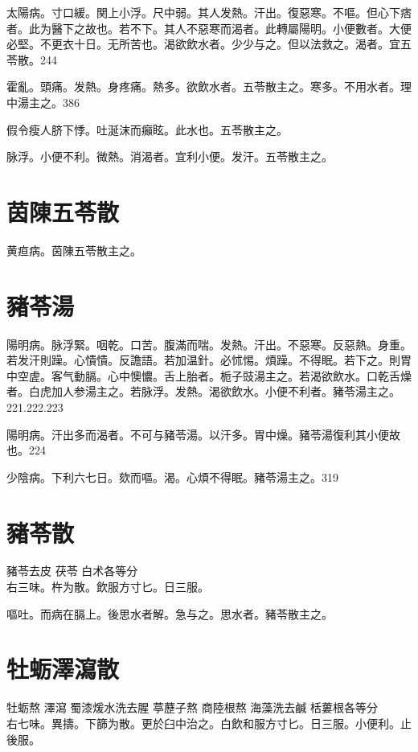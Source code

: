 太陽病。寸{\khaaitp 口}緩。関{\khaaitp 上小}浮。尺{\khaaitp 中}弱。其人发熱。汗出。復惡寒。不嘔。但心下痞者。此为醫下之故也。若不下。其人不惡寒而渴者。此轉屬陽明。小便數者。大便必堅。不更衣十日。无所苦也。{\khaaitp 渴}欲飲水者。少少与之。但以法救之。渴者。宜五苓散。244

霍亂。頭痛。发熱。身疼痛。熱多。欲飲水者。五苓散主之。寒多。不用水者。理中湯主之。386

假令瘦人脐下悸。吐涎沫而癲眩。{\khaaitp 此}水也。五苓散主之。

脉浮。小便不利。微熱。消渴者。宜利小便。发汗。五苓散主之。

\section{茵陳五苓散}

黄疸病。茵陳五苓散主之。

\section{豬苓湯}

陽明病。脉浮緊。咽乾。口苦。腹滿而喘。发熱。汗出。不惡寒。反惡熱。身重。若发汗則躁。心憒憒。反譫語。若加温針。必怵惕。煩躁。不得眠。若下之。則胃中空虗。客气動膈。心中懊憹。舌上胎者。栀子{\khaaitp 豉}湯主之。若渴欲飲水。口乾舌燥者。白虎{\khaaitp 加人参}湯主之。若脉浮。发熱。渴欲飲水。小便不利者。豬苓湯主之。221.222.223

陽明病。汗出多而渴者。不可与豬苓湯。以汗多。胃中燥。豬苓湯復利其小便故也。224

少陰病。下利六七日。欬而嘔。渴。心煩不得眠。豬苓湯主之。319

\section{豬苓散}

豬苓{\scriptsize\khaaitp 去皮} 茯苓{ }白术{\scriptsize 各等分}\\
右三味。杵为散。飲服方寸匕。日三服。

嘔吐。而病在膈上。後思水者解。急与之。思水者。豬苓散主之。

\section{牡蛎澤瀉散}

牡蛎{\scriptsize 熬} 澤瀉 蜀漆{\scriptsize 煖水洗去腥} 葶藶子{\scriptsize 熬} 商陸根{\scriptsize 熬} 海藻{\scriptsize 洗去鹹} 栝蔞根{\scriptsize 各等分}\\
右七味。異擣。下篩为散。更於臼中治之。白飲和服方寸匕。日三服。小便利。止後服。

